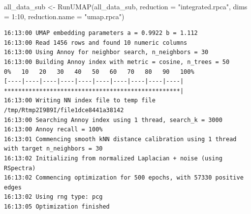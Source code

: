 \documentclass[
  letterpaper,
  DIV=11,
  numbers=noendperiod]{scrreprt}
\newenvironment{Shaded}{\begin{snugshade}}{\end{snugshade}}
\newcommand{\AttributeTok}[1]{\textcolor[rgb]{0.40,0.45,0.13}{#1}}
\newcommand{\DecValTok}[1]{\textcolor[rgb]{0.68,0.00,0.00}{#1}}
\newcommand{\FunctionTok}[1]{\textcolor[rgb]{0.28,0.35,0.67}{#1}}
\newcommand{\NormalTok}[1]{\textcolor[rgb]{0.00,0.23,0.31}{#1}}
\newcommand{\OtherTok}[1]{\textcolor[rgb]{0.00,0.23,0.31}{#1}}
\newcommand{\SpecialCharTok}[1]{\textcolor[rgb]{0.37,0.37,0.37}{#1}}
\newcommand{\StringTok}[1]{\textcolor[rgb]{0.13,0.47,0.30}{#1}}
\begin{document}
\begin{Shaded}
\begin{Highlighting}[]
\NormalTok{all\_data\_sub }\OtherTok{\textless{}{-}} \FunctionTok{RunUMAP}\NormalTok{(all\_data\_sub, }\AttributeTok{reduction =} \StringTok{"integrated.rpca"}\NormalTok{, }\AttributeTok{dims =} \DecValTok{1}\SpecialCharTok{:}\DecValTok{10}\NormalTok{, }\AttributeTok{reduction.name =} \StringTok{"umap.rpca"}\NormalTok{)}
\end{Highlighting}
\end{Shaded}

\begin{verbatim}
16:13:00 UMAP embedding parameters a = 0.9922 b = 1.112
16:13:00 Read 1456 rows and found 10 numeric columns
16:13:00 Using Annoy for neighbor search, n_neighbors = 30
16:13:00 Building Annoy index with metric = cosine, n_trees = 50
0%   10   20   30   40   50   60   70   80   90   100%
[----|----|----|----|----|----|----|----|----|----|
**************************************************|
16:13:00 Writing NN index file to temp file /tmp/Rtmp2I9B9I/file1dce8441a38142
16:13:00 Searching Annoy index using 1 thread, search_k = 3000
16:13:00 Annoy recall = 100%
16:13:01 Commencing smooth kNN distance calibration using 1 thread with target n_neighbors = 30
16:13:02 Initializing from normalized Laplacian + noise (using RSpectra)
16:13:02 Commencing optimization for 500 epochs, with 57330 positive edges
16:13:02 Using rng type: pcg
16:13:05 Optimization finished
\end{verbatim}
\end{document}
